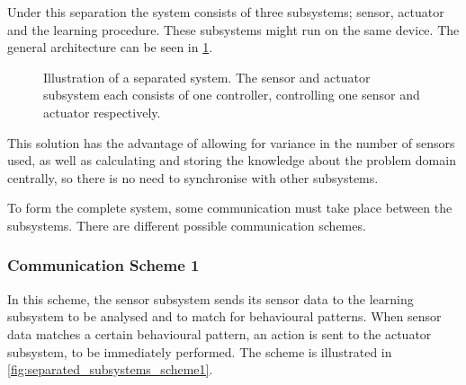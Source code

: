 Under this separation the system consists of three subsystems; sensor, actuator and the learning procedure. These subsystems might run on the same device. The general architecture can be seen in \cref{fig:separated_subsystems}.

\begin{figure}[htbp]
\centering
{}
\caption[Separated system]{Illustration of a separated system. The sensor and actuator subsystem each consists of one controller, controlling one sensor and actuator respectively.}\label{fig:separated_subsystems}
\end{figure}

This solution has the advantage of allowing for variance in the number of sensors used, as well as calculating and storing the knowledge about the problem domain centrally, so there is no need to synchronise with other subsystems.

To form the complete system, some communication must take place between the subsystems. There are different possible communication schemes.

\subsubsection{Communication Scheme 1}

In this scheme, the sensor subsystem sends its sensor data to the learning subsystem to be analysed and to match for behavioural patterns. When sensor data matches a certain behavioural pattern, an action is sent to the actuator subsystem, to be immediately performed.  The scheme is illustrated in \cref{fig:separated_subsystems_scheme1}.

